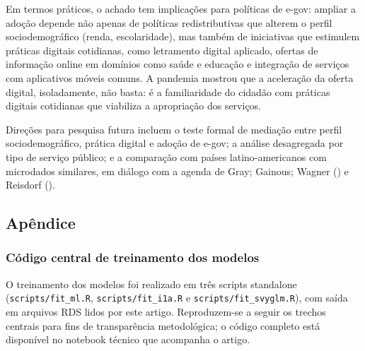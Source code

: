 \documentclass[
  man,
  floatsintext,
  longtable,
  a4paper,
  nolmodern,
  notxfonts,
  notimes,
  colorlinks=true,linkcolor=blue,citecolor=blue,urlcolor=blue]{apa7}
\begin{document}
Em termos práticos, o achado tem implicações para políticas de e-gov:
ampliar a adoção depende não apenas de políticas redistributivas que
alterem o perfil sociodemográfico (renda, escolaridade), mas também de
iniciativas que estimulem práticas digitais cotidianas, como letramento
digital aplicado, ofertas de informação online em domínios como saúde e
educação e integração de serviços com aplicativos móveis comuns. A
pandemia mostrou que a aceleração da oferta digital, isoladamente, não
basta: é a familiaridade do cidadão com práticas digitais cotidianas que
viabiliza a apropriação dos serviços.

Direções para pesquisa futura incluem o teste formal de mediação entre
perfil sociodemográfico, prática digital e adoção de e-gov; a análise
desagregada por tipo de serviço público; e a comparação com países
latino-americanos com microdados similares, em diálogo com a agenda de
Gray; Gainous; Wagner () e
Reisdorf ().

\subsection{Apêndice}\label{apuxeandice}

\subsubsection{Código central de treinamento dos
modelos}\label{cuxf3digo-central-de-treinamento-dos-modelos}

O treinamento dos modelos foi realizado em três scripts standalone
(\texttt{scripts/fit\_ml.R}, \texttt{scripts/fit\_i1a.R} e
\texttt{scripts/fit\_svyglm.R}), com saída em arquivos RDS lidos por
este artigo. Reproduzem-se a seguir os trechos centrais para fins de
transparência metodológica; o código completo está disponível no
notebook técnico que acompanha o artigo.
\end{document}
